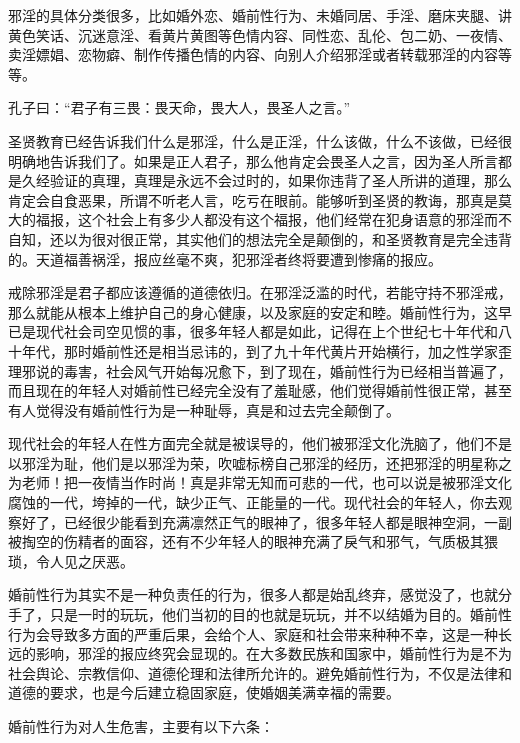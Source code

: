 \documentclass[fontset=founder]{ctexart}
\begin{document}
邪淫的具体分类很多，比如婚外恋、婚前性行为、未婚同居、手淫、磨床夹腿、讲黄色笑话、沉迷意淫、看黄片黄图等色情内容、同性恋、乱伦、包二奶、一夜情、卖淫嫖娼、恋物癖、制作传播色情的内容、向别人介绍邪淫或者转载邪淫的内容等等。

孔子曰：“君子有三畏：畏天命，畏大人，畏圣人之言。”

圣贤教育已经告诉我们什么是邪淫，什么是正淫，什么该做，什么不该做，已经很明确地告诉我们了。如果是正人君子，那么他肯定会畏圣人之言，因为圣人所言都是久经验证的真理，真理是永远不会过时的，如果你违背了圣人所讲的道理，那么肯定会自食恶果，所谓不听老人言，吃亏在眼前。能够听到圣贤的教诲，那真是莫大的福报，这个社会上有多少人都没有这个福报，他们经常在犯身语意的邪淫而不自知，还以为很对很正常，其实他们的想法完全是颠倒的，和圣贤教育是完全违背的。天道福善祸淫，报应丝毫不爽，犯邪淫者终将要遭到惨痛的报应。

戒除邪淫是君子都应该遵循的道德依归。在邪淫泛滥的时代，若能守持不邪淫戒，那么就能从根本上维护自己的身心健康，以及家庭的安定和睦。婚前性行为，这早已是现代社会司空见惯的事，很多年轻人都是如此，记得在上个世纪七十年代和八十年代，那时婚前性还是相当忌讳的，到了九十年代黄片开始横行，加之性学家歪理邪说的毒害，社会风气开始每况愈下，到了现在，婚前性行为已经相当普遍了，而且现在的年轻人对婚前性已经完全没有了羞耻感，他们觉得婚前性很正常，甚至有人觉得没有婚前性行为是一种耻辱，真是和过去完全颠倒了。

现代社会的年轻人在性方面完全就是被误导的，他们被邪淫文化洗脑了，他们不是以邪淫为耻，他们是以邪淫为荣，吹嘘标榜自己邪淫的经历，还把邪淫的明星称之为老师！把一夜情当作时尚！真是非常无知而可悲的一代，也可以说是被邪淫文化腐蚀的一代，垮掉的一代，缺少正气、正能量的一代。现代社会的年轻人，你去观察好了，已经很少能看到充满凛然正气的眼神了，很多年轻人都是眼神空洞，一副被掏空的伤精者的面容，还有不少年轻人的眼神充满了戾气和邪气，气质极其猥琐，令人见之厌恶。

婚前性行为其实不是一种负责任的行为，很多人都是始乱终弃，感觉没了，也就分手了，只是一时的玩玩，他们当初的目的也就是玩玩，并不以结婚为目的。婚前性行为会导致多方面的严重后果，会给个人、家庭和社会带来种种不幸，这是一种长远的影响，邪淫的报应终究会显现的。在大多数民族和国家中，婚前性行为是不为社会舆论、宗教信仰、道德伦理和法律所允许的。避免婚前性行为，不仅是法律和道德的要求，也是今后建立稳固家庭，使婚姻美满幸福的需要。

婚前性行为对人生危害，主要有以下六条：
\end{document}
